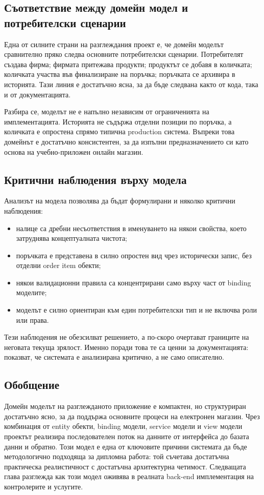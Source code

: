 \subsection{Съответствие между домейн модел и потребителски сценарии}

Една от силните страни на разглеждания проект е, че домейн моделът сравнително пряко следва основните потребителски сценарии. Потребителят създава фирма; фирмата притежава продукти; продуктът се добавя в количката; количката участва във финализиране на поръчка; поръчката се архивира в историята. Тази линия е достатъчно ясна, за да бъде следвана както от кода, така и от документацията.

Разбира се, моделът не е напълно независим от ограниченията на имплементацията. Историята не съдържа отделни позиции по поръчка, а количката е опростена спрямо типична production система. Въпреки това домейнът е достатъчно консистентен, за да изпълни предназначението си като основа на учебно-приложен онлайн магазин.

\subsection{Критични наблюдения върху модела}

Анализът на модела позволява да бъдат формулирани и няколко критични наблюдения:

\begin{itemize}[leftmargin=*]
    \item налице са дребни несъответствия в именуването на някои свойства, което затруднява концептуалната чистота;
    \item поръчката е представена в силно опростен вид чрез исторически запис, без отделни order item обекти;
    \item някои валидационни правила са концентрирани само върху част от binding моделите;
    \item моделът е силно ориентиран към един потребителски тип и не включва роли или права.
\end{itemize}

Тези наблюдения не обезсилват решението, а по-скоро очертават границите на неговата текуща зрялост. Именно поради това те са ценни за документацията: показват, че системата е анализирана критично, а не само описателно.

\subsection{Обобщение}

Домейн моделът на разглежданото приложение е компактен, но структуриран достатъчно ясно, за да поддържа основните процеси на електронен магазин. Чрез комбинация от entity обекти, binding модели, service модели и view модели проектът реализира последователен поток на данните от интерфейса до базата данни и обратно. Този модел е една от ключовите причини системата да бъде методологично подходяща за дипломна работа: той съчетава достатъчна практическа реалистичност с достатъчна архитектурна четимост. Следващата глава разглежда как този модел оживява в реалната back-end имплементация на контролерите и услугите.
